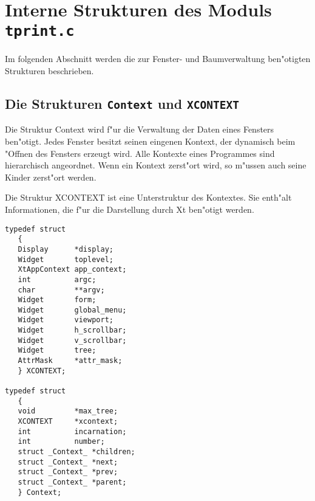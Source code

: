 
\section{Interne Strukturen des Moduls {\tt tprint.c}}

Im folgenden Abschnitt werden die zur Fenster- und Baumverwaltung ben"otigten
Strukturen beschrieben.

\subsection{Die Strukturen {\tt Context} und {\tt XCONTEXT}}

Die Struktur Context wird f"ur die Verwaltung der Daten eines Fensters
ben"otigt. Jedes Fenster besitzt seinen eingenen Kontext, der dynamisch
beim "Offnen des Fensters erzeugt wird. Alle Kontexte eines Programmes
sind hierarchisch angeordnet. Wenn ein Kontext zerst"ort wird, so 
m"ussen auch seine Kinder zerst"ort werden.

Die Struktur XCONTEXT ist eine Unterstruktur des Kontextes. Sie enth"alt
Informationen, die f"ur die Darstellung durch Xt ben"otigt werden.


\begin{verbatim}
typedef struct 
   {
   Display      *display;   
   Widget       toplevel;  
   XtAppContext app_context;
   int          argc;      
   char         **argv;   
   Widget       form;   
   Widget       global_menu; 
   Widget       viewport;   
   Widget       h_scrollbar; 
   Widget       v_scrollbar; 
   Widget       tree;   
   AttrMask     *attr_mask; 
   } XCONTEXT;

typedef struct 
   {
   void         *max_tree;   
   XCONTEXT     *xcontext;  
   int          incarnation;
   int          number; 
   struct _Context_ *children; 
   struct _Context_ *next; 
   struct _Context_ *prev;
   struct _Context_ *parent; 
   } Context;
\end{verbatim}


